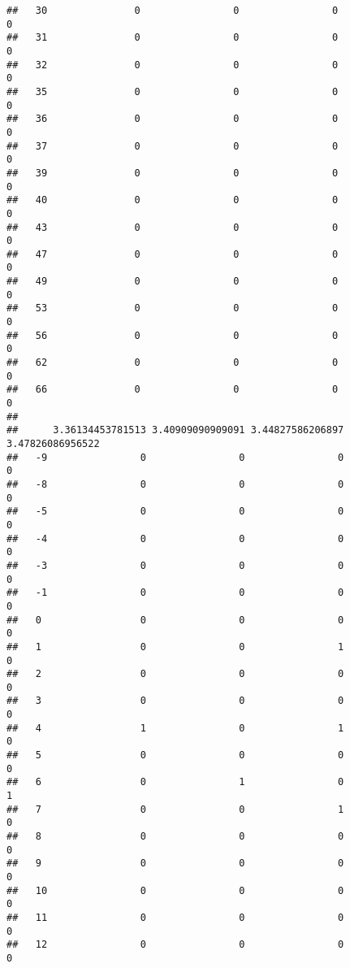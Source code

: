 \documentclass[]{article}
\begin{document}
\begin{verbatim}
##   30               0                0                0                0
##   31               0                0                0                0
##   32               0                0                0                0
##   35               0                0                0                0
##   36               0                0                0                0
##   37               0                0                0                0
##   39               0                0                0                0
##   40               0                0                0                0
##   43               0                0                0                0
##   47               0                0                0                0
##   49               0                0                0                0
##   53               0                0                0                0
##   56               0                0                0                0
##   62               0                0                0                0
##   66               0                0                0                0
##     
##      3.36134453781513 3.40909090909091 3.44827586206897 3.47826086956522
##   -9                0                0                0                0
##   -8                0                0                0                0
##   -5                0                0                0                0
##   -4                0                0                0                0
##   -3                0                0                0                0
##   -1                0                0                0                0
##   0                 0                0                0                0
##   1                 0                0                1                0
##   2                 0                0                0                0
##   3                 0                0                0                0
##   4                 1                0                1                0
##   5                 0                0                0                0
##   6                 0                1                0                1
##   7                 0                0                1                0
##   8                 0                0                0                0
##   9                 0                0                0                0
##   10                0                0                0                0
##   11                0                0                0                0
##   12                0                0                0                0

\end{verbatim}
\end{document}
